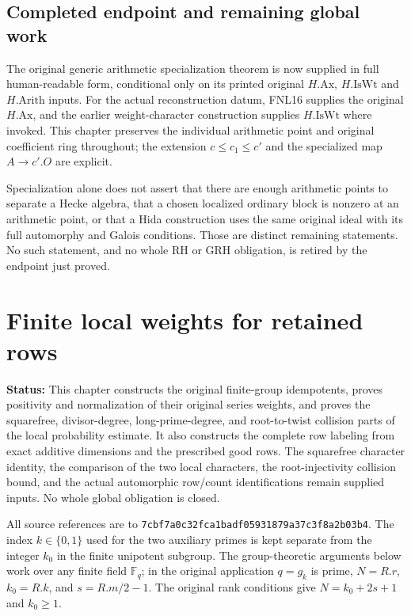 \documentclass[11pt,a4paper]{article}
\numberwithin{equation}{section}
\theoremstyle{remark}\newtheorem{remark}[theorem]{Remark}
\newcommand{\status}[1]{\textbf{Status:} #1}
\begin{document}
\subsection{Completed endpoint and remaining global work}

The original generic arithmetic specialization
theorem is now supplied in full human-readable
form, conditional only on its printed original
$H.\mathrm{Ax}$, $H.\mathrm{IsWt}$ and
$H.\mathrm{Arith}$ inputs.  For the actual
reconstruction datum, FNL16 supplies the
original $H.\mathrm{Ax}$, and the earlier
weight-character construction supplies
$H.\mathrm{IsWt}$ where invoked.  This
chapter preserves the individual arithmetic
point and original coefficient ring throughout;
the extension $c\leq c_1\leq c'$ and the
specialized map $A\to c'.O$ are explicit.

Specialization alone does not assert that
there are enough arithmetic points to separate
a Hecke algebra, that a chosen localized
ordinary block is nonzero at an arithmetic
point, or that a Hida construction uses the
same original ideal with its full automorphy
and Galois conditions.  Those are distinct
remaining statements.  No such statement,
and no whole RH or GRH obligation, is retired
by the endpoint just proved.


\section{Finite local weights for retained rows}
\label{sec:retained-rows-v42}

\status{This chapter constructs the original finite-group idempotents,
proves positivity and normalization of their original series weights,
and proves the squarefree, divisor-degree, long-prime-degree, and
root-to-twist collision parts of the local probability estimate.
It also constructs the complete
row labeling from exact additive dimensions and the prescribed good
rows.  The squarefree character identity, the comparison of the two
local characters, the root-injectivity collision bound, and the actual
automorphic row/count identifications remain supplied inputs.  No
whole global obligation is closed.}

All source references are to
\texttt{7cbf7a0c32fca1badf05931879a37c3f8a2b03b4}.
The index $k\in\{0,1\}$ used for the two auxiliary primes is kept
separate from the integer $k_0$ in the finite unipotent subgroup.
The group-theoretic arguments below work over any finite field
$\mathbb F_q$; in the original application $q=g_k$ is prime,
$N=R.r$, $k_0=R.k$, and $s=R.m/2-1$.  The original rank conditions
give $N=k_0+2s+1$ and $k_0\ge1$.
\end{document}

